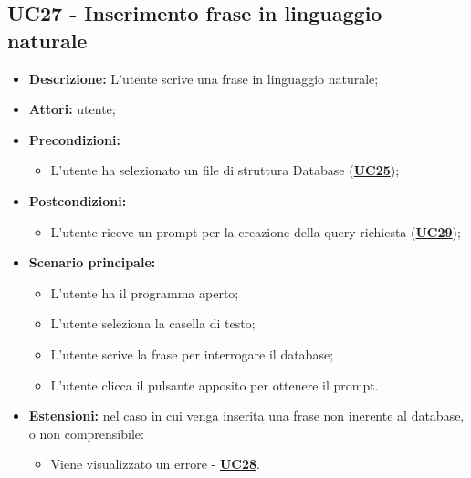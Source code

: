 \subsection{UC27 - Inserimento frase in linguaggio naturale}
\label{sec:UC27}
\begin{itemize}
	\item \textbf{Descrizione:} L’utente scrive una frase in linguaggio naturale;
	\item \textbf{Attori:} utente;
	\item \textbf{Precondizioni:} 
	\begin{itemize}
		\item L’utente ha selezionato un file di struttura Database (\hyperref[sec:UC25]{\textbf{UC25}});
	\end{itemize}
	\item \textbf{Postcondizioni:} 
	\begin{itemize}
		\item L’utente riceve un prompt per la creazione della query richiesta (\hyperref[sec:UC29]{\textbf{UC29}});
	\end{itemize}
	\item \textbf{Scenario principale:} 
	\begin{itemize}
		\item L’utente ha il programma aperto;
		\item L’utente seleziona la casella di testo;
		\item L’utente scrive la frase per interrogare il database;
		\item L’utente clicca il pulsante apposito per ottenere il prompt.
	\end{itemize}
	\item \textbf{Estensioni:} nel caso in cui venga inserita una frase non inerente al database, o non comprensibile:
	\begin{itemize}
		\item Viene visualizzato un errore - \hyperref[sec:UC28]{\textbf{UC28}}.
	\end{itemize}
\end{itemize}

